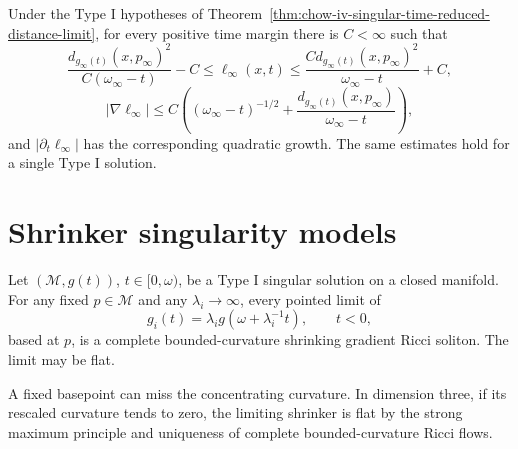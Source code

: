 \begin{proposition}
\label{prop:chow-iv-limit-reduced-distance-estimates}
Under the Type I hypotheses of
Theorem~\ref{thm:chow-iv-singular-time-reduced-distance-limit}, for every
positive time margin there is \(C<\infty\) such that
\[
 \frac{d_{g_\infty(t)}(x,p_\infty)^2}{C(\omega_\infty-t)}-C
 \leq\ell_\infty(x,t)\leq
 \frac{C d_{g_\infty(t)}(x,p_\infty)^2}{\omega_\infty-t}+C,
\]
\[
 |\nabla\ell_\infty|\leq C\left((\omega_\infty-t)^{-1/2}
 +\frac{d_{g_\infty(t)}(x,p_\infty)}{\omega_\infty-t}\right),
\]
and \(|\partial_t\ell_\infty|\) has the corresponding quadratic growth.
The same estimates hold for a single Type I solution.
\end{proposition}

\section{Shrinker singularity models}

\begin{proposition}
\label{prop:chow-iv-fixed-basepoint-type-i-limits-shrinkers}
Let \((\mathcal M,g(t))\), \(t\in[0,\omega)\), be a Type I singular
solution on a closed manifold.  For any fixed \(p\in\mathcal M\) and any
\(\lambda_i\to\infty\), every pointed limit of
\[
 g_i(t)=\lambda_i g(\omega+\lambda_i^{-1}t),\qquad t<0,
\]
based at \(p\), is a complete bounded-curvature shrinking gradient Ricci
soliton.  The limit may be flat.
\end{proposition}

\begin{remark}
\label{rem:chow-iv-flat-fixed-basepoint-type-i-limit}
A fixed basepoint can miss the concentrating curvature.  In dimension three,
if its rescaled curvature tends to zero, the limiting shrinker is flat by the
strong maximum principle and uniqueness of complete bounded-curvature Ricci
flows.
\end{remark}


